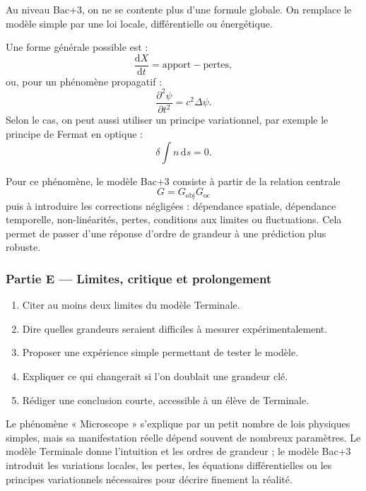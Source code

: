 \documentclass[11pt,a4paper]{article}
\begin{document}
\begin{approfondissementbox}
Au niveau Bac+3, on ne se contente plus d'une formule globale. On remplace le modèle simple par une loi locale, différentielle ou énergétique.

Une forme générale possible est :
\[
\frac{\mathrm d X}{\mathrm dt}=\text{apport}-\text{pertes},
\]
ou, pour un phénomène propagatif :
\[
\frac{\partial^2 \psi}{\partial t^2}=c^2\Delta\psi.
\]
Selon le cas, on peut aussi utiliser un principe variationnel, par exemple le principe de Fermat en optique :
\[
\delta \int n\,\mathrm ds=0.
\]

Pour ce phénomène, le modèle Bac+3 consiste à partir de la relation centrale
\[
G=G_{\mathrm{obj}}G_{\mathrm{oc}}
\]
puis à introduire les corrections négligées : dépendance spatiale, dépendance temporelle, non-linéarités, pertes, conditions aux limites ou fluctuations. Cela permet de passer d'une réponse d'ordre de grandeur à une prédiction plus robuste.
\end{approfondissementbox}

\subsubsection*{Partie E — Limites, critique et prolongement}

\begin{enumerate}
  \item Citer au moins deux limites du modèle Terminale.
  \item Dire quelles grandeurs seraient difficiles à mesurer expérimentalement.
  \item Proposer une expérience simple permettant de tester le modèle.
  \item Expliquer ce qui changerait si l'on doublait une grandeur clé.
  \item Rédiger une conclusion courte, accessible à un élève de Terminale.
\end{enumerate}

\begin{corrigebox}
Le phénomène « Microscope » s'explique par un petit nombre de lois physiques simples, mais sa manifestation réelle dépend souvent de nombreux paramètres. Le modèle Terminale donne l'intuition et les ordres de grandeur ; le modèle Bac+3 introduit les variations locales, les pertes, les équations différentielles ou les principes variationnels nécessaires pour décrire finement la réalité.
\end{corrigebox}
\end{document}
